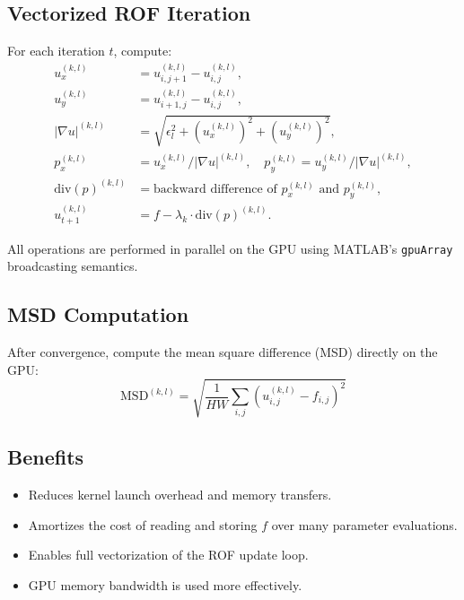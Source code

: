 \documentclass{article}
\begin{document}
\subsection{Vectorized ROF Iteration}

For each iteration \( t \), compute:
\begin{align*}
u_x^{(k,l)} &= u^{(k,l)}_{i,j+1} - u^{(k,l)}_{i,j}, \\
u_y^{(k,l)} &= u^{(k,l)}_{i+1,j} - u^{(k,l)}_{i,j}, \\
|\nabla u|^{(k,l)} &= \sqrt{ \epsilon_l^2 + (u_x^{(k,l)})^2 + (u_y^{(k,l)})^2 }, \\
p_x^{(k,l)} &= u_x^{(k,l)} / |\nabla u|^{(k,l)}, \quad
p_y^{(k,l)} = u_y^{(k,l)} / |\nabla u|^{(k,l)}, \\
\text{div}(p)^{(k,l)} &= \text{backward difference of } p_x^{(k,l)} \text{ and } p_y^{(k,l)}, \\
u^{(k,l)}_{t+1} &= f - \lambda_k \cdot \text{div}(p)^{(k,l)}.
\end{align*}

All operations are performed in parallel on the GPU using MATLAB's \texttt{gpuArray}
broadcasting semantics.

\subsection{MSD Computation}

After convergence, compute the mean square difference (MSD) directly on the GPU:
\[
\text{MSD}^{(k,l)} = \sqrt{ \frac{1}{HW} \sum_{i,j} (u_{i,j}^{(k,l)} - f_{i,j})^2 }
\]

\subsection{Benefits}

\begin{itemize}
    \item Reduces kernel launch overhead and memory transfers.
    \item Amortizes the cost of reading and storing \(f\) over many parameter evaluations.
    \item Enables full vectorization of the ROF update loop.
    \item GPU memory bandwidth is used more effectively.
\end{itemize}
\end{document}
